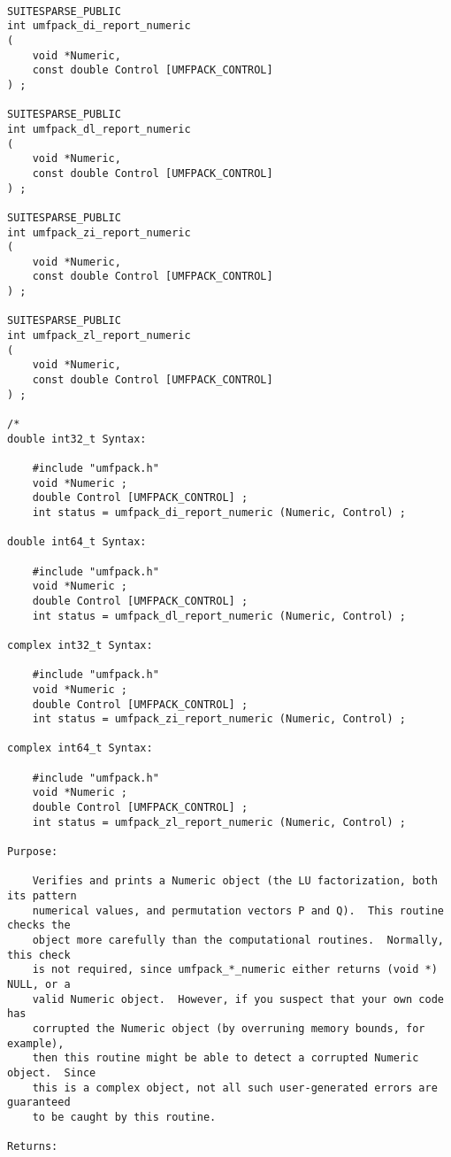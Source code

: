 \documentclass[11pt]{article}
\begin{document}
{\footnotesize
\begin{verbatim}

SUITESPARSE_PUBLIC
int umfpack_di_report_numeric
(
    void *Numeric,
    const double Control [UMFPACK_CONTROL]
) ;

SUITESPARSE_PUBLIC
int umfpack_dl_report_numeric
(
    void *Numeric,
    const double Control [UMFPACK_CONTROL]
) ;

SUITESPARSE_PUBLIC
int umfpack_zi_report_numeric
(
    void *Numeric,
    const double Control [UMFPACK_CONTROL]
) ;

SUITESPARSE_PUBLIC
int umfpack_zl_report_numeric
(
    void *Numeric,
    const double Control [UMFPACK_CONTROL]
) ;

/*
double int32_t Syntax:

    #include "umfpack.h"
    void *Numeric ;
    double Control [UMFPACK_CONTROL] ;
    int status = umfpack_di_report_numeric (Numeric, Control) ;

double int64_t Syntax:

    #include "umfpack.h"
    void *Numeric ;
    double Control [UMFPACK_CONTROL] ;
    int status = umfpack_dl_report_numeric (Numeric, Control) ;

complex int32_t Syntax:

    #include "umfpack.h"
    void *Numeric ;
    double Control [UMFPACK_CONTROL] ;
    int status = umfpack_zi_report_numeric (Numeric, Control) ;

complex int64_t Syntax:

    #include "umfpack.h"
    void *Numeric ;
    double Control [UMFPACK_CONTROL] ;
    int status = umfpack_zl_report_numeric (Numeric, Control) ;

Purpose:

    Verifies and prints a Numeric object (the LU factorization, both its pattern
    numerical values, and permutation vectors P and Q).  This routine checks the
    object more carefully than the computational routines.  Normally, this check
    is not required, since umfpack_*_numeric either returns (void *) NULL, or a
    valid Numeric object.  However, if you suspect that your own code has
    corrupted the Numeric object (by overruning memory bounds, for example),
    then this routine might be able to detect a corrupted Numeric object.  Since
    this is a complex object, not all such user-generated errors are guaranteed
    to be caught by this routine.

Returns:


\end{verbatim}}
\end{document}
